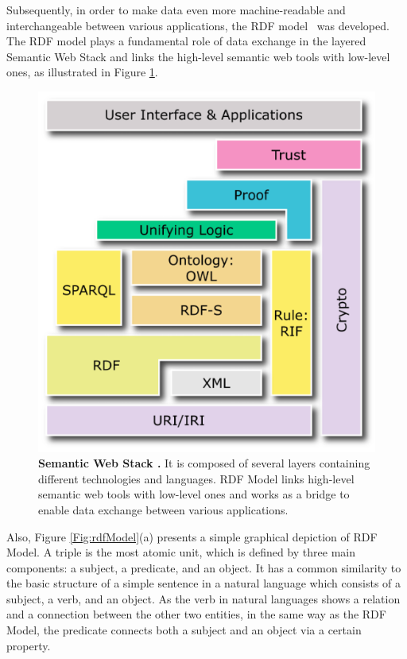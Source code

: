 Subsequently, in order to make data even more machine-readable and interchangeable between various applications, the RDF model~\cite{W3C:RDF-Primer:Online} was developed.  
The RDF model plays a fundamental role of data exchange in the layered Semantic Web Stack and links the high-level semantic web tools with low-level ones, as illustrated in {Figure \ref{Fig:semanticWebStack}}. 
	\begin{figure}[ht]
	\begin{center}
	\setlength\belowcaptionskip{-7mm}
		\includegraphics[scale=0.5,angle=0]{images/semanticWebStack}
		\caption{\textbf{Semantic Web Stack \cite{W3C:SemanticStack:Online}.} It is composed of several layers containing different technologies and languages. 
		RDF Model links high-level semantic web tools with low-level ones and works as a bridge to enable data exchange between various applications.}
		\label{Fig:semanticWebStack}
	\end{center}
\end{figure}
\par
Also, {Figure \ref{Fig:rdfModel}}(a) presents a simple graphical depiction of RDF Model. 
A triple is the most atomic unit, which is defined by three main components: a subject, a predicate, and an object. 
It has a common similarity to the basic structure of a simple sentence in a natural language which consists of a subject, a verb, and an object. 
As the verb in natural languages shows a relation and a connection between the other two entities, in the same way as the RDF Model, the predicate connects both a subject and an object via a certain property. 

